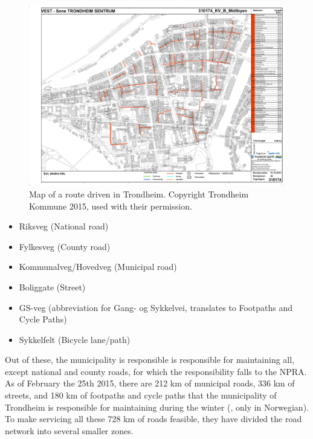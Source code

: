 \begin{landscape}
\begin{figure}[thbp]
    \centerline{\includegraphics[height=0.945\textwidth]{figures/Routes/PreExisting/310174.pdf}}
    \caption{Map of a route driven in Trondheim. Copyright Trondheim Kommune 2015, used with their permission.}
    \label{fig:map_KV_B_used}
\end{figure}
\end{landscape}

\begin{itemize}
    \item Riksveg (National road)
    \item Fylkesveg (County road)
    \item Kommunalveg/Hovedveg (Municipal road)
    \item Boliggate (Street)
    \item GS-veg (abbreviation for Gang- og Sykkelvei, translates to Footpaths and Cycle Paths) %
    \item Sykkelfelt (Bicycle lane/path)
\end{itemize}


Out of these, the municipality is responsible is responsible for maintaining all, except national and county roads, for which the responsibility falls to the NPRA. As of February the 25th 2015, there are 212 km of municipal roads, 336 km of streets, and 180 km of footpaths and cycle paths that the municipality of Trondheim is responsible for maintaining during the winter (\citep{trondheimKommuneVinterdriftNettside}, only in Norwegian). To make servicing all these 728 km of roads feasible, they have divided the road network into several smaller zones.

